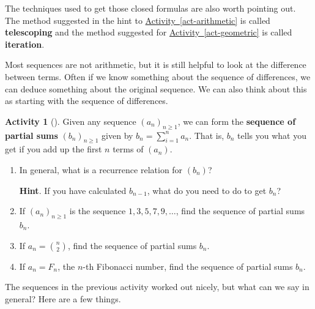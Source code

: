 \documentclass[10pt,]{book}
\newcommand{\terminology}[1]{\textbf{#1}}
\theoremstyle{plain}
\theoremstyle{definition}
\theoremstyle{definition}
\theoremstyle{definition}
\newtheorem{activity}[project]{Activity}
\theoremstyle{definition}
\numberwithin{equation}{chapter}
\begin{document}
\par
\hypertarget{p-833}{}%
The techniques used to get those closed formulas are also worth pointing out.  The method suggested in the hint to \hyperref[act-arithmetic]{Activity~\ref{act-arithmetic}} is called \terminology{telescoping} and the method suggested for \hyperref[act-geometric]{Activity~\ref{act-geometric}} is called \terminology{iteration}.%
\par
\hypertarget{p-834}{}%
Most sequences are not arithmetic, but it is still helpful to look at the difference between terms.  Often if we know something about the sequence of differences, we can deduce something about the original sequence.   We can also think about this as starting with the sequence of differences.%
\begin{activity}[]\label{activity-88}
\hypertarget{p-835}{}%
Given any sequence \((a_n)_{n \ge 1}\), we can form the \terminology{sequence of partial sums} \((b_n)_{n \ge 1}\) given by \(b_n = \sum_{i = 1}^n a_n\).  That is, \(b_n\) tells you what you get if you add up the first \(n\) terms of \((a_n)\).%
\begin{enumerate}[font=\bfseries,label=(\alph*),ref=\alph*]
\item\label{task-104} \hypertarget{p-836}{}%
In general, what is a recurrence relation for \((b_n)\)?%
\par\smallskip%
\noindent\textbf{Hint}.\hypertarget{hint-81}{}\quad%
\hypertarget{p-837}{}%
If you have calculated \(b_{n-1}\), what do you need to do to get \(b_n\)?%
\item\label{task-105} \hypertarget{p-838}{}%
If \((a_n)_{n \ge 1}\) is the sequence \(1, 3, 5, 7, 9, \ldots\), find the sequence of partial sums \(b_n\).%
\item\label{task-106} \hypertarget{p-839}{}%
If \(a_n = \binom{n}{2}\), find the sequence of partial sums \(b_n\).%
\item\label{task-107} \hypertarget{p-840}{}%
If \(a_n = F_n\), the \(n\)-th Fibonacci number, find the sequence of partial sums \(b_n\).%
\end{enumerate}
\end{activity}
\hypertarget{p-841}{}%
The sequences in the previous activity worked out nicely, but what can we say in general?  Here are a few things.%
\end{document}
